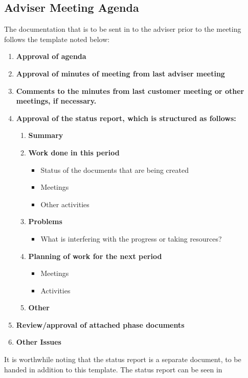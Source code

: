 \documentclass[../document]{subfiles}
\begin{document}
\subsection{Adviser Meeting Agenda}
\label{adviser_meeting_agenda}
The documentation that is to be sent in to the adviser prior to the meeting follows the template noted below:

\begin{enumerate}
	\item
	\textbf{Approval of agenda}
	\item
	\textbf{Approval of minutes of meeting from last adviser meeting}
	\item
	\textbf{Comments to the minutes from last customer meeting or other meetings, if necessary.}
	\item
	\textbf{Approval of the status report, which is structured as follows:}
	\begin{enumerate}[label*=\arabic*.]
		\item
		\textbf{Summary}
		\item
		\textbf{Work done in this period}
		\begin{itemize}
			\item
			Status of the documents that are being created
			\item
			Meetings
			\item
			Other activities
		\end{itemize}
		\item
		\textbf{Problems}
		\begin{itemize}
			\item
			What is interfering with the progress or taking resources?
		\end{itemize}
		\item
		\textbf{Planning of work for the next period}
		\begin{itemize}
			\item
			Meetings
			\item
			Activities
		\end{itemize}
		\item
		\textbf{Other}
	\end{enumerate}
	\item
	\textbf{Review/approval of attached phase documents}
	\item
	\textbf{Other Issues}
\end{enumerate}

It is worthwhile noting that the status report is a separate document, to be handed in addition to this template. The status report can be seen in 
\end{document}
